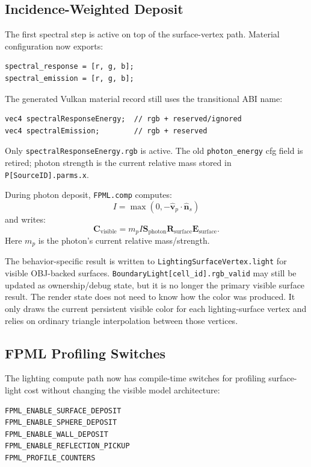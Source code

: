 \subsection{Incidence-Weighted Deposit}

The first spectral step is active on top of the surface-vertex path.  Material
configuration now exports:
\begin{verbatim}
spectral_response = [r, g, b];
spectral_emission = [r, g, b];
\end{verbatim}

The generated Vulkan material record still uses the transitional ABI name:
\begin{verbatim}
vec4 spectralResponseEnergy;  // rgb + reserved/ignored
vec4 spectralEmission;        // rgb + reserved
\end{verbatim}
Only \texttt{spectralResponseEnergy.rgb} is active.  The old
\texttt{photon\_energy} cfg field is retired; photon strength is the current
relative mass stored in \texttt{P[SourceID].parms.x}.

During photon deposit, \texttt{FPML.comp} computes:
\[
    I =
    \max \left(0, -\hat{\mathbf v}_{p} \cdot \hat{\mathbf n}_{s}\right)
\]
and writes:
\[
    \mathbf C_{\mathrm{visible}} =
    m_p I
    \mathbf S_{\mathrm{photon}}
    \mathbf R_{\mathrm{surface}}
    \mathbf E_{\mathrm{surface}} .
\]
Here \(m_p\) is the photon's current relative mass/strength.

The behavior-specific result is written to
\texttt{LightingSurfaceVertex.light} for visible OBJ-backed surfaces.
\texttt{BoundaryLight[cell\_id].rgb\_valid} may still be updated as
ownership/debug state, but it is no longer the primary visible surface result.
The render state does not need to know how the color was produced.  It only
draws the current persistent visible color for each lighting-surface vertex and
relies on ordinary triangle interpolation between those vertices.

\subsection{FPML Profiling Switches}

The lighting compute path now has compile-time switches for profiling
surface-light cost without changing the visible model architecture:
\begin{verbatim}
FPML_ENABLE_SURFACE_DEPOSIT
FPML_ENABLE_SPHERE_DEPOSIT
FPML_ENABLE_WALL_DEPOSIT
FPML_ENABLE_REFLECTION_PICKUP
FPML_PROFILE_COUNTERS
\end{verbatim}

